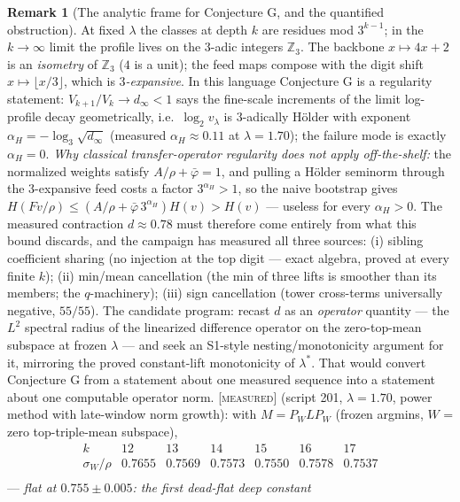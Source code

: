 \documentclass[11pt]{article}
\theoremstyle{definition}
\newtheorem{remark}[theorem]{Remark}
\newcommand{\MEASURED}{\textup{[\textsc{measured}]}}
\newcommand{\Z}{\mathbb{Z}}
\newcommand{\lam}{\lambda}
\begin{document}
\begin{remark}[The analytic frame for Conjecture G, and the quantified
obstruction]\label{rem:Gframe}
At fixed $\lam$ the classes at depth $k$ are residues mod $3^{k-1}$;
in the $k \to \infty$ limit the profile lives on the $3$-adic integers
$\Z_3$. The backbone $x \mapsto 4x+2$ is an \emph{isometry} of $\Z_3$
($4$ is a unit); the feed maps compose with the digit shift
$x \mapsto \lfloor x/3 \rfloor$, which is \emph{$3$-expansive}. In this
language Conjecture G is a regularity statement:
$V_{k+1}/V_k \to d_\infty < 1$ says the fine-scale increments of the
limit log-profile decay geometrically, i.e.\ $\log_2 v_\lam$ is
$3$-adically H\"older with exponent
$\alpha_H = -\log_3 \sqrt{d_\infty}$ (measured $\alpha_H \approx 0.11$
at $\lam = 1.70$); the failure mode is exactly $\alpha_H = 0$.
\emph{Why classical transfer-operator regularity does not apply
off-the-shelf:} the normalized weights satisfy
$A/\rho + \bar\varphi = 1$, and pulling a H\"older seminorm through the
$3$-expansive feed costs a factor $3^{\alpha_H} > 1$, so the naive
bootstrap gives $H(Fv/\rho) \le (A/\rho + \bar\varphi\, 3^{\alpha_H})
H(v) > H(v)$ --- useless for every $\alpha_H > 0$. The measured
contraction $d \approx 0.78$ must therefore come entirely from what
this bound discards, and the campaign has measured all three sources:
(i) sibling coefficient sharing (no injection at the top digit ---
exact algebra, proved at every finite $k$); (ii) min/mean cancellation
(the min of three lifts is smoother than its members; the $q$-machinery);
(iii) sign cancellation (tower cross-terms universally negative,
$55/55$). The candidate program: recast $d$ as an \emph{operator}
quantity --- the $L^2$ spectral radius of the linearized difference
operator on the zero-top-mean subspace at frozen $\lam$ --- and seek an
S1-style nesting/monotonicity argument for it, mirroring the proved
constant-lift monotonicity of $\lam^*$. That would convert Conjecture G
from a statement about one measured sequence into a statement about one
computable operator norm.
\MEASURED{} (script 201, $\lam = 1.70$, power method with late-window
norm growth): with $M = P_W L P_W$ (frozen argmins, $W$ = zero
top-triple-mean subspace),
\[
\begin{array}{lcccccc}
k & 12 & 13 & 14 & 15 & 16 & 17 \\
\sigma_W/\rho & 0.7655 & 0.7569 & 0.7573 & 0.7550 & 0.7578 & 0.7537 \\
\end{array}
\]
--- \emph{flat at $0.755 \pm 0.005$: the first dead-flat deep constant
}
\end{remark}
\end{document}
